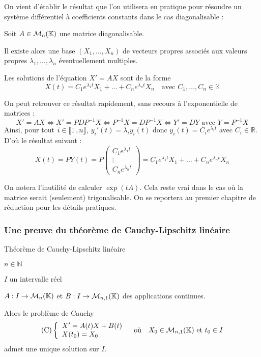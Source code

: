     On vient d’établir le résultat que l’on utilisera en pratique pour résoudre un système différentiel à coefficients constants dans le cas diagonalisable :

    \begin{theo}{}{}
        Soit $A \in \mathcal{M}_{n}(\mathbb{K})$ une matrice diagonalisable. 

        Il existe alors une base $(X_1,\ldots,X_n)$ de vecteurs propres associés aux valeurs propres $\lambda_1,\ldots,\lambda_n$ éventuellement multiples.

        Les solutions de l’équation $X' = AX$ sont de la forme 
        \[ X(t) = C_1 e^{\lambda_1 t} X_1 + \ldots + C_n e^{\lambda_n t} X_n \quad \text{avec } C_1,\ldots,C_n \in \mathbb{K} \]
    \end{theo}

    On peut retrouver ce résultat rapidement, sans recours à l’exponentielle de matrices :
    \[ X' = AX \iff X' = P D P^{-1} X \iff P^{-1} X = D P^{-1} X \iff Y' = DY \text{ avec } Y = P^{-1} X \] 
    Ainsi, pour tout $i \in \left\llbracket 1 \, , n \right\rrbracket$, $y_i'(t) = \lambda_i y_i(t)$ donc $y_i(t) = C_i e^{\lambda_i t}$ avec $C_i \in \mathbb{R}$. D’où le résultat suivant : 
    \[ X(t) = PY(t) = P \begin{pmatrix}
        C_1 e^{\lambda_1 t} \\
        \vdots \\
        C_n e^{\lambda_n t}
    \end{pmatrix} = C_1 e^{\lambda_1 t} X_1 + \ldots + C_n e^{\lambda_n t} X_n \]

    On notera l’inutilité de calculer $\exp(tA)$. Cela reste vrai dans le cas où la matrice serait (seulement) trigonalisable. On se reportera au premier chapitre de réduction pour les détails pratiques.

    \subsubsection{Une preuve du théorème de Cauchy-Lipschitz linéaire}

    \begin{theo}{Théorème de Cauchy-Lipschitz linéaire}{}
        \begin{soient}
            \item $n \in \mathbb{N}$
            \item $I$ un intervalle réel 
            \item $A : I \to \mathcal{M}_{n}(\mathbb{K})$ et $B : I \to \mathcal{M}_{n,1}(\mathbb{K})$ des applications continues.
        \end{soient}
        Alors le problème de Cauchy 
        \[ \text{(C)} \hfill \et{X' = A(t) X + B(t)}{X(t_0) = X_0} \quad \text{où} \quad X_0 \in \mk{n,1} \text{ et } t_0 \in I \]
        admet une unique solution sur $I$.
    \end{theo}

